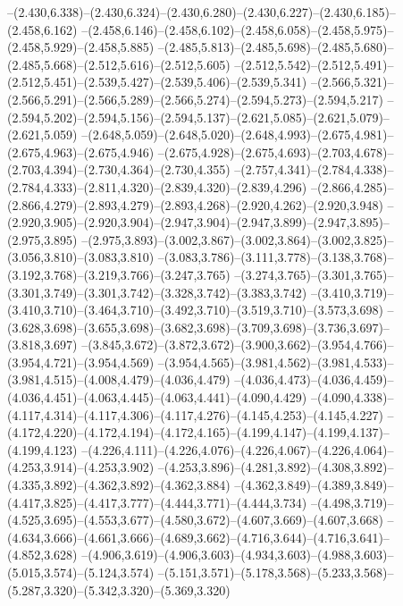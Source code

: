   --(2.430,6.338)--(2.430,6.324)--(2.430,6.280)--(2.430,6.227)--(2.430,6.185)--(2.458,6.162)%
  --(2.458,6.146)--(2.458,6.102)--(2.458,6.058)--(2.458,5.975)--(2.458,5.929)--(2.458,5.885)%
  --(2.485,5.813)--(2.485,5.698)--(2.485,5.680)--(2.485,5.668)--(2.512,5.616)--(2.512,5.605)%
  --(2.512,5.542)--(2.512,5.491)--(2.512,5.451)--(2.539,5.427)--(2.539,5.406)--(2.539,5.341)%
  --(2.566,5.321)--(2.566,5.291)--(2.566,5.289)--(2.566,5.274)--(2.594,5.273)--(2.594,5.217)%
  --(2.594,5.202)--(2.594,5.156)--(2.594,5.137)--(2.621,5.085)--(2.621,5.079)--(2.621,5.059)%
  --(2.648,5.059)--(2.648,5.020)--(2.648,4.993)--(2.675,4.981)--(2.675,4.963)--(2.675,4.946)%
  --(2.675,4.928)--(2.675,4.693)--(2.703,4.678)--(2.703,4.394)--(2.730,4.364)--(2.730,4.355)%
  --(2.757,4.341)--(2.784,4.338)--(2.784,4.333)--(2.811,4.320)--(2.839,4.320)--(2.839,4.296)%
  --(2.866,4.285)--(2.866,4.279)--(2.893,4.279)--(2.893,4.268)--(2.920,4.262)--(2.920,3.948)%
  --(2.920,3.905)--(2.920,3.904)--(2.947,3.904)--(2.947,3.899)--(2.947,3.895)--(2.975,3.895)%
  --(2.975,3.893)--(3.002,3.867)--(3.002,3.864)--(3.002,3.825)--(3.056,3.810)--(3.083,3.810)%
  --(3.083,3.786)--(3.111,3.778)--(3.138,3.768)--(3.192,3.768)--(3.219,3.766)--(3.247,3.765)%
  --(3.274,3.765)--(3.301,3.765)--(3.301,3.749)--(3.301,3.742)--(3.328,3.742)--(3.383,3.742)%
  --(3.410,3.719)--(3.410,3.710)--(3.464,3.710)--(3.492,3.710)--(3.519,3.710)--(3.573,3.698)%
  --(3.628,3.698)--(3.655,3.698)--(3.682,3.698)--(3.709,3.698)--(3.736,3.697)--(3.818,3.697)%
  --(3.845,3.672)--(3.872,3.672)--(3.900,3.662)--(3.954,4.766)--(3.954,4.721)--(3.954,4.569)%
  --(3.954,4.565)--(3.981,4.562)--(3.981,4.533)--(3.981,4.515)--(4.008,4.479)--(4.036,4.479)%
  --(4.036,4.473)--(4.036,4.459)--(4.036,4.451)--(4.063,4.445)--(4.063,4.441)--(4.090,4.429)%
  --(4.090,4.338)--(4.117,4.314)--(4.117,4.306)--(4.117,4.276)--(4.145,4.253)--(4.145,4.227)%
  --(4.172,4.220)--(4.172,4.194)--(4.172,4.165)--(4.199,4.147)--(4.199,4.137)--(4.199,4.123)%
  --(4.226,4.111)--(4.226,4.076)--(4.226,4.067)--(4.226,4.064)--(4.253,3.914)--(4.253,3.902)%
  --(4.253,3.896)--(4.281,3.892)--(4.308,3.892)--(4.335,3.892)--(4.362,3.892)--(4.362,3.884)%
  --(4.362,3.849)--(4.389,3.849)--(4.417,3.825)--(4.417,3.777)--(4.444,3.771)--(4.444,3.734)%
  --(4.498,3.719)--(4.525,3.695)--(4.553,3.677)--(4.580,3.672)--(4.607,3.669)--(4.607,3.668)%
  --(4.634,3.666)--(4.661,3.666)--(4.689,3.662)--(4.716,3.644)--(4.716,3.641)--(4.852,3.628)%
  --(4.906,3.619)--(4.906,3.603)--(4.934,3.603)--(4.988,3.603)--(5.015,3.574)--(5.124,3.574)%
  --(5.151,3.571)--(5.178,3.568)--(5.233,3.568)--(5.287,3.320)--(5.342,3.320)--(5.369,3.320)%
